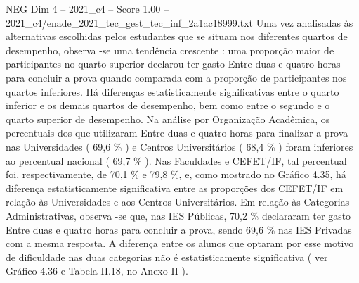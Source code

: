 \begin{textsample}{NEG Dim 4 – 2021\_c4 – Score 1.00 – 2021\_c4/enade\_2021\_tec\_gest\_tec\_inf\_2a1ac18999.txt}
Uma vez analisadas às alternativas escolhidas pelos estudantes que se situam nos diferentes quartos de desempenho, observa -se uma tendência crescente : uma proporção maior de participantes no quarto superior declarou ter gasto Entre duas e quatro horas para concluir a prova quando comparada com a proporção de participantes nos quartos inferiores.
Há diferenças estatisticamente significativas entre o quarto inferior e os demais quartos de desempenho, bem como entre o segundo e o quarto superior de desempenho.
Na análise por Organização Acadêmica, os percentuais dos que utilizaram Entre duas e quatro horas para finalizar a prova nas Universidades ( 69,6 \% ) e Centros Universitários ( 68,4 \% ) foram inferiores ao percentual nacional ( 69,7 \% ).
Nas Faculdades e CEFET/IF, tal percentual foi, respectivamente, de 70,1 \% e 79,8 \%, e, como mostrado no Gráfico 4.35, há diferença estatisticamente significativa entre as proporções dos CEFET/IF em relação às Universidades e aos Centros Universitários.
Em relação às Categorias Administrativas, observa -se que, nas IES Públicas, 70,2 \% declararam ter gasto Entre duas e quatro horas para concluir a prova, sendo 69,6 \% nas IES Privadas com a mesma resposta.
A diferença entre os alunos que optaram por esse motivo de dificuldade nas duas categorias não é estatisticamente significativa ( ver Gráfico 4.36 e Tabela II.18, no Anexo II ).

\end{textsample}
